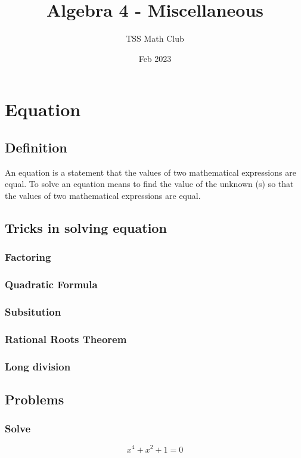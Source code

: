 \documentclass{article}
\title{Algebra 4 - Miscellaneous}
\author{TSS Math Club}
\date{Feb 2023}
\begin{document}
\large

\maketitle

\section{Equation}

\subsection{Definition}
An equation is a statement that the values of two mathematical expressions are equal.
To solve an equation means to find the value of the unknown (s) so that the values of two mathematical expressions are equal.

\subsection{Tricks in solving equation}

\subsubsection{Factoring}
\vspace{40px}
\subsubsection{Quadratic Formula}
\vspace{40px}
\subsubsection{Subsitution}
\vspace{40px}
\subsubsection{Rational Roots Theorem}
\vspace{40px}
\subsubsection{Long division}
\vspace{40px}
\pagebreak
\subsection{Problems}
\subsubsection{Solve}
$$x^4+x^2+1=0$$
\vspace{40px}
\end{document}
